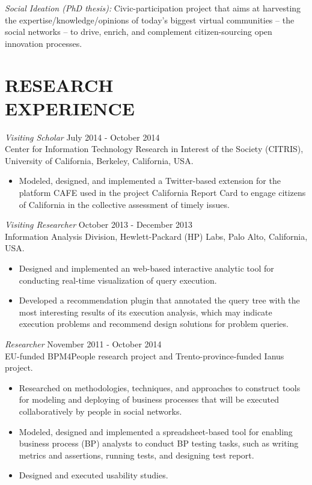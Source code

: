 \documentclass[line,margin]{res}
\begin{document}
\begin{resume}
	{\sl Social Ideation (PhD thesis):} Civic-participation project that aims at harvesting the expertise/knowledge/opinions of today's biggest virtual communities -- the social networks -- to drive, enrich, and complement citizen-sourcing open innovation processes.
	
 
\section{RESEARCH \\ EXPERIENCE} 
{\sl Visiting Scholar} \hfill July 2014 - October 2014 \\
Center for Information Technology Research in Interest of the Society (CITRIS), University of California, Berkeley, California, USA.
\begin{itemize}  \itemsep -2pt %
\item Modeled, designed, and implemented a Twitter-based extension for the platform CAFE used in the project California Report Card to engage citizens of California in the collective assessment of timely issues.
\end{itemize}

{\sl Visiting Researcher} \hfill October 2013 - December 2013 \\
Information Analysis Division, Hewlett-Packard (HP) Labs, Palo Alto, California, USA.
\begin{itemize}  \itemsep -2pt %
\item Designed and implemented an web-based interactive analytic tool for conducting real-time visualization of query execution.
\item Developed a recommendation plugin that annotated the query tree with the most interesting results of its execution analysis, which may indicate execution problems and recommend design solutions for problem queries.
\end{itemize}

{\sl Researcher} \hfill November 2011 - October 2014 \\
EU-funded BPM4People research project and Trento-province-funded Ianus project.
\begin{itemize}  \itemsep -2pt %
\item Researched on methodologies, techniques, and approaches to construct tools for modeling and deploying of business processes that will be executed collaboratively by people in social networks.
\item Modeled, designed and implemented a spreadsheet-based tool for enabling business process (BP) analysts to conduct BP testing tasks, such as writing metrics and assertions, running tests, and designing test report.
\item Designed and executed usability studies.
\end{itemize}


\end{resume}
\end{document}
